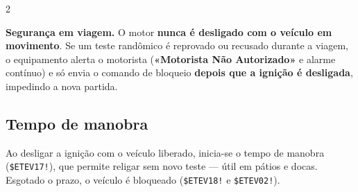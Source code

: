 \documentclass[a4paper,10pt]{article}
\newcommand{\ev}[1]{\texttt{\$ETEV#1!}}
\newcommand{\tela}[1]{\textbf{«#1»}}
\begin{document}
\begin{multicols}{2}
\begin{nota}
\textbf{Segurança em viagem.} O motor \textbf{nunca é desligado com o veículo em movimento}.
Se um teste randômico é reprovado ou recusado durante a viagem, o equipamento alerta o
motorista (\tela{Motorista Não Autorizado} e alarme contínuo) e só envia o comando de bloqueio
\textbf{depois que a ignição é desligada}, impedindo a nova partida.
\end{nota}

\subsection{Tempo de manobra}
Ao desligar a ignição com o veículo liberado, inicia-se o tempo de manobra (\ev{17}), que
permite religar sem novo teste — útil em pátios e docas. Esgotado o prazo, o veículo é
bloqueado (\ev{18} e \ev{02}).

\end{multicols}
\end{document}
